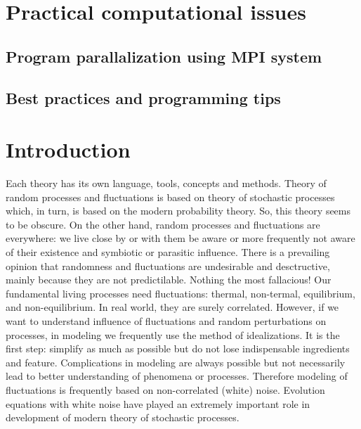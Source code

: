 \documentclass[authoryear,draft,1p,times]{elsarticle}
\renewcommand{\=}{\stackrel{\mathrm{d}}{=}}
\begin{document}
\section{Practical computational issues }

\subsection{Program parallalization using MPI system}
\subsection{Best practices and programming tips}



%


\newpage

\section*{Introduction}

Each theory has its own  language, tools, concepts and methods. Theory of random processes 
and fluctuations is based on  theory of stochastic processes which, in turn, is based on the modern probability theory.  So, this theory  seems to be obscure.  On the other hand, random processes and fluctuations are everywhere: we live  close by or with them be aware or more frequently not aware of  their existence and symbiotic or parasitic influence. 
There is a prevailing opinion that randomness and fluctuations are   undesirable and desctructive, mainly because they are not predictilable.  Nothing the most  fallacious! 
Our fundamental living processes need fluctuations: thermal, non-termal, equilibrium, and non-equilibrium. In real world, they are surely correlated. However,  if we want to understand 
influence of fluctuations and random perturbations on processes, in modeling we frequently 
use the method of idealizations. It is the first step: simplify as much as possible but do not lose 
indispensable ingredients and feature.  Complications in modeling are always possible but not necessarily lead to  better understanding of phenomena or processes.  Therefore modeling of  fluctuations  is frequently based on non-correlated  (white) noise. Evolution equations with  white noise have played  an extremely important role in development of modern theory of stochastic  processes. 
\end{document}

